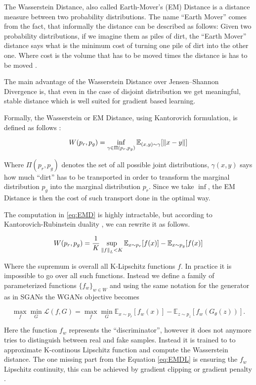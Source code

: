 The Wasserstein Distance, also called Earth-Mover's (EM) Distance is a distance
measure between two probability distributions. The name ``Earth Mover'' comes
from the fact, that informally the distance can be described as follows: Given
two probability distributions, if we imagine them as piles of dirt, the ``Earth
Mover'' distance says what is the minimum cost of turning one pile of dirt into the
other one. Where cost is the volume that has to be moved times the distance is
has to be moved \cite{villani@optimal}.

The main advantage of the Wasserstein Distance over Jensen–Shannon Divergence is,
that even in the case of disjoint distribution we get meaningful, stable
distance which is well suited for gradient based learning.

Formally, the Wasserstein or EM Distance, using Kantorovich formulation, is
defined as follows \cite{villani@optimal}:

\begin{equation}
  \label{eq:EMD}
  W(p_r, p_g) = \inf_{\gamma \in \Pi(p_r, p_g)} \mathbb{E}_{(x, y) \sim \gamma}[\left\lVert x-y\right\rVert]
\end{equation}

Where $\Pi(p_r, p_g)$ denotes the set of all possible joint distributions,
$\gamma(x,y)$ says how much ``dirt'' has to be transported in order to transform
the marginal distribution $p_g$ into the marginal distribution $p_r$. Since we take $\inf$, the EM Distance is then the cost of such
transport done in the optimal way. 

The computation in \ref{eq:EMD} is highly intractable, but according to
Kantorovich-Rubinstein duality \cite{villani@optimal}, we can rewrite it as
follows.

\begin{equation}
  \label{eq:EMD2}
  W(p_r, p_g) = \frac{1}{K} \sup_{\left\lVert f\right\rVert_L < K} \mathbb{E}_{x \sim p_r}[f(x)] - \mathbb{E}_{x \sim p_g}[f(x)]
\end{equation}

Where the supremum is overall all K-Lipschitz functions $f$. In practice it is
impossible to go over all such functions. Instead we define a family of parameterized
functions $\{f_{w}\}_{w \in W}$ and using the same notation for the generator as
in SGANs the WGANs objective becomes


\begin{equation}
  \label{eq:EMDL}
  \max_{f}\min_{G}\mathcal{L}(f, G) = \max_{f}\min_{G}  \mathbb{E}_{x \sim p_r}[f_w(x)] - \mathbb{E}_{z \sim p_z}[f_w(G_{\theta}(z))].
\end{equation}

Here the function $f_w$ represents the ``discriminator'', however it does not
anymore tries to distinguish between real and fake samples. Instead it is
trained to to approximate K-continous Lipschitz function and compute the
Wasserstein distance. The one missing part from the Equation \ref{eq:EMDL} is
ensuring the $f_w$ Lipschitz continuity, this can be achieved by gradient
clipping \cite{arjovsky2017wasserstein} or gradient penalty \cite{gulrajani2017improved}.

